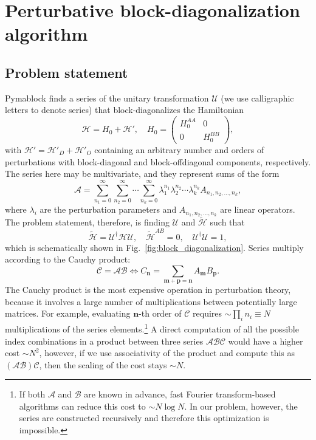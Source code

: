 \section{Perturbative block-diagonalization algorithm}

\subsection{Problem statement}

Pymablock finds a series of the unitary transformation $\mathcal{U}$ (we use calligraphic letters to denote series) that block-diagonalizes the Hamiltonian
%
\begin{equation}
\label{eq:hamiltonian}
\mathcal{H} = H_0 + \mathcal{H}',\quad H_0 = \begin{pmatrix}
H_0^{AA} & 0\\
0 & H_0^{BB}
\end{pmatrix},
\end{equation}
%
with $\mathcal{H}' = \mathcal{H}'_{D} + \mathcal{H}'_{O}$ containing an arbitrary number and orders of perturbations with block-diagonal and block-offdiagonal components, respectively.
The series here may be multivariate, and they represent sums of the form
%
\begin{equation}
\mathcal{A} = \sum_{n_1=0}^\infty \sum_{n_2=0}^\infty \cdots \sum_{n_k=0}^\infty \lambda_1^{n_1} \lambda_2^{n_2} \cdots \lambda_k^{n_k} A_{n_1, n_2, \ldots, n_k},
\end{equation}
%
where $\lambda_i$ are the perturbation parameters and $A_{n_1, n_2, \ldots, n_k}$ are linear operators.
%
The problem statement, therefore, is finding $\mathcal{U}$ and $\tilde{\mathcal{H}}$ such that
%
\begin{equation}
\label{eq:problem_definition}
\tilde{\mathcal{H}} = \mathcal{U}^\dagger \mathcal{H} \mathcal{U},\quad \tilde{\mathcal{H}}^{AB} = 0,\quad \mathcal{U}^\dagger \mathcal{U} = 1,
\end{equation}
%
which is schematically shown in Fig.~\ref{fig:block_diagonalization}.
Series multiply according to the Cauchy product:
%
$$
\mathcal{C} = \mathcal{A}\mathcal{B} \Leftrightarrow C_\mathbf{n} = \sum_{\mathbf{m} + \mathbf{p} = \mathbf{n}} A_\mathbf{m} B_\mathbf{p}.
$$
%
The Cauchy product is the most expensive operation in perturbation theory, because it involves a large number of multiplications between potentially large matrices.
For example, evaluating $\mathbf{n}$-th order of $\mathcal{C}$ requires $\sim\prod_i n_i \equiv N$ multiplications of the series elements.\footnote{If both $\mathcal{A}$ and $\mathcal{B}$ are known in advance, fast Fourier transform-based algorithms can reduce this cost to $\sim N \log N$. In our problem, however, the series are constructed recursively and therefore this optimization is impossible.}
A direct computation of all the possible index combinations in a product between three series $\mathcal{A}\mathcal{B}\mathcal{C}$ would have a higher cost $\sim N^2$, however, if we use associativity of the product and compute this as $(\mathcal{A}\mathcal{B})\mathcal{C}$, then the scaling of the cost stays $\sim N$.

